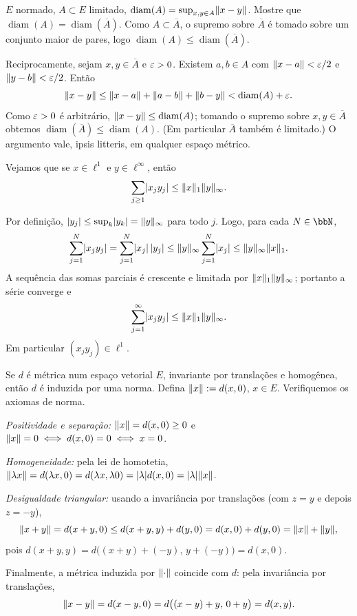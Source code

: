 \begin{exercicio}{$E$ normado, $A\subset E$ limitado, $\operatorname{diam}(A)=\sup_{x,y\in A}\lVert x-y\rVert$. Mostre que $\operatorname{diam}(A)=\operatorname{diam}(\overline{A})$.}
\sol
Como $A\subset\overline{A}$, o supremo sobre $\overline{A}$ é tomado sobre um conjunto maior de pares, logo $\operatorname{diam}(A)\le \operatorname{diam}(\overline{A})$.

Reciprocamente, sejam $x,y\in\overline{A}$ e $\varepsilon>0$. Existem $a,b\in A$ com $\lVert x-a\rVert<\varepsilon/2$ e $\lVert y-b\rVert<\varepsilon/2$. Então
\[ \lVert x-y\rVert\le \lVert x-a\rVert+\lVert a-b\rVert+\lVert b-y\rVert < \operatorname{diam}(A)+\varepsilon. \]
Como $\varepsilon>0$ é arbitrário, $\lVert x-y\rVert\le\operatorname{diam}(A)$; tomando o supremo sobre $x,y\in\overline{A}$ obtemos $\operatorname{diam}(\overline{A})\le\operatorname{diam}(A)$. (Em particular $\overline{A}$ também é limitado.) O argumento vale, ipsis litteris, em qualquer espaço métrico.
\end{exercicio}

\begin{exercicio}{Vejamos que se $x\in \ell^1$ e $y\in \ell^\infty$, então 
  $$\sum_{j\ge1}\lvert x_jy_j\rvert\le\lVert x\rVert_1\lVert y\rVert_\infty.$$}

Por definição, $\lvert y_j\rvert\le \sup_k \lvert y_k\rvert=\lVert y\rVert_\infty$ para todo $j$. Logo, para cada $N\in\N$,
\[ \sum_{j=1}^{N}\lvert x_jy_j\rvert=\sum_{j=1}^{N}\lvert x_j\rvert\,\lvert y_j\rvert \le \lVert y\rVert_\infty\sum_{j=1}^{N}\lvert x_j\rvert \le \lVert y\rVert_\infty\lVert x\rVert_1. \]
A sequência das somas parciais é crescente e limitada por $\lVert x\rVert_1\lVert y\rVert_\infty$; portanto a série converge e
\[ \sum_{j=1}^{\infty}\lvert x_jy_j\rvert\le \lVert x\rVert_1\lVert y\rVert_\infty. \]
Em particular $(x_jy_j)\in \ell^1$.
\end{exercicio}
\begin{exercicio}{Se $d$ é métrica num espaço vetorial $E$, invariante por translações e homogênea, então $d$ é induzida por uma norma.}
\sol
Defina $\lVert x\rVert:=d(x,0)$, $x\in E$. Verifiquemos os axiomas de norma.

\emph{Positividade e separação:} $\lVert x\rVert=d(x,0)\ge 0$ e $\lVert x\rVert=0\iff d(x,0)=0\iff x=0$.

\emph{Homogeneidade:} pela lei de homotetia, $\lVert\lambda x\rVert=d(\lambda x,0)=d(\lambda x,\lambda 0)=\lvert\lambda\rvert d(x,0)=\lvert\lambda\rvert\lVert x\rVert$.

\emph{Desigualdade triangular:} usando a invariância por translações (com $z=y$ e depois $z=-y$),
\[ \lVert x+y\rVert=d(x+y,0)\le d(x+y,y)+d(y,0)=d(x,0)+d(y,0)=\lVert x\rVert+\lVert y\rVert, \]
pois $d(x+y,y)=d\bigl((x+y)+(-y),\,y+(-y)\bigr)=d(x,0)$.

Finalmente, a métrica induzida por $\lVert\cdot\rVert$ coincide com $d$: pela invariância por translações,
\[ \lVert x-y\rVert=d(x-y,0)=d\bigl((x-y)+y,\,0+y\bigr)=d(x,y). \]
\end{exercicio}

